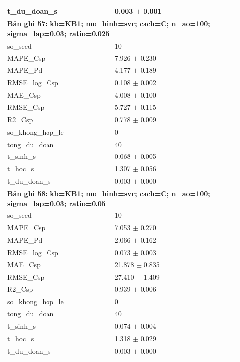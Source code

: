 \begin{longtable}{p{0.43\linewidth}p{0.50\linewidth}}
t\_\allowbreak du\_\allowbreak doan\_\allowbreak s & 0.003 $\pm$ 0.001 \\
\midrule
\multicolumn{2}{p{0.95\linewidth}}{\textbf{Bản ghi 57: kb=KB1; mo\_hinh=svr; cach=C; n\_ao=100; sigma\_lap=0.03; ratio=0.025}} \\
so\_\allowbreak seed & 10 \\
MAPE\_\allowbreak Csp & 7.926 $\pm$ 0.230 \\
MAPE\_\allowbreak Pd & 4.177 $\pm$ 0.189 \\
RMSE\_\allowbreak log\_\allowbreak Csp & 0.108 $\pm$ 0.002 \\
MAE\_\allowbreak Csp & 4.008 $\pm$ 0.100 \\
RMSE\_\allowbreak Csp & 5.727 $\pm$ 0.115 \\
R2\_\allowbreak Csp & 0.778 $\pm$ 0.009 \\
so\_\allowbreak khong\_\allowbreak hop\_\allowbreak le & 0 \\
tong\_\allowbreak du\_\allowbreak doan & 40 \\
t\_\allowbreak sinh\_\allowbreak s & 0.068 $\pm$ 0.005 \\
t\_\allowbreak hoc\_\allowbreak s & 1.307 $\pm$ 0.056 \\
t\_\allowbreak du\_\allowbreak doan\_\allowbreak s & 0.003 $\pm$ 0.000 \\
\midrule
\multicolumn{2}{p{0.95\linewidth}}{\textbf{Bản ghi 58: kb=KB1; mo\_hinh=svr; cach=C; n\_ao=100; sigma\_lap=0.03; ratio=0.05}} \\
so\_\allowbreak seed & 10 \\
MAPE\_\allowbreak Csp & 7.053 $\pm$ 0.270 \\
MAPE\_\allowbreak Pd & 2.066 $\pm$ 0.162 \\
RMSE\_\allowbreak log\_\allowbreak Csp & 0.073 $\pm$ 0.003 \\
MAE\_\allowbreak Csp & 21.878 $\pm$ 0.835 \\
RMSE\_\allowbreak Csp & 27.410 $\pm$ 1.409 \\
R2\_\allowbreak Csp & 0.939 $\pm$ 0.006 \\
so\_\allowbreak khong\_\allowbreak hop\_\allowbreak le & 0 \\
tong\_\allowbreak du\_\allowbreak doan & 40 \\
t\_\allowbreak sinh\_\allowbreak s & 0.074 $\pm$ 0.004 \\
t\_\allowbreak hoc\_\allowbreak s & 1.318 $\pm$ 0.029 \\
t\_\allowbreak du\_\allowbreak doan\_\allowbreak s & 0.003 $\pm$ 0.000 \\

\end{longtable}
